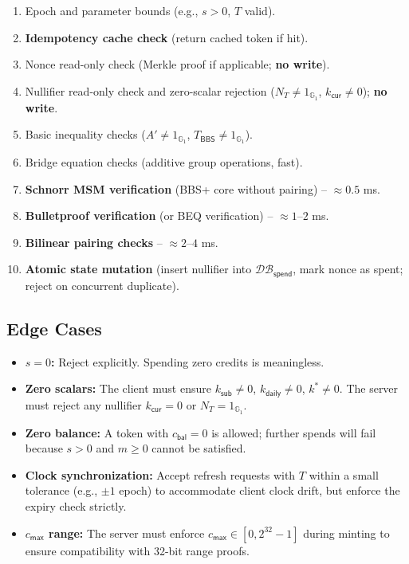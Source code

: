 \documentclass[11pt]{article}
\theoremstyle{definitionstyle}
\theoremstyle{plain}
\newcommand{\DB}{\mathcal{DB}}
\begin{document}
\begin{enumerate}[leftmargin=*]
\item Epoch and parameter bounds (e.g., $s > 0$, $T$ valid).
\item \textbf{Idempotency cache check} (return cached token if hit).
\item Nonce read-only check (Merkle proof if applicable; \textbf{no write}).
\item Nullifier read-only check and zero-scalar rejection ($N_T \neq 1_{\mathbb{G}_1}$, $k_{\mathsf{cur}} \neq 0$); \textbf{no write}.
\item Basic inequality checks ($A' \neq 1_{\mathbb{G}_1}$, $T_{\mathsf{BBS}} \neq 1_{\mathbb{G}_1}$).
\item Bridge equation checks (additive group operations, fast).
\item \textbf{Schnorr MSM verification} (BBS+ core without pairing) – $\approx 0.5$ ms.
\item \textbf{Bulletproof verification} (or BEQ verification) – $\approx 1$--$2$ ms.
\item \textbf{Bilinear pairing checks} – $\approx 2$--$4$ ms.
\item \textbf{Atomic state mutation} (insert nullifier into $\DB_{\mathsf{spend}}$, mark nonce as spent; reject on concurrent duplicate).
\end{enumerate}

\subsection{Edge Cases}

\begin{itemize}[leftmargin=*]
\item \textbf{$s = 0$:} Reject explicitly. Spending zero credits is meaningless.
\item \textbf{Zero scalars:} The client must ensure $k_{\mathsf{sub}} \neq 0$, $k_{\mathsf{daily}} \neq 0$, $k^* \neq 0$. The server must reject any nullifier $k_{\mathsf{cur}} = 0$ or $N_T = 1_{\mathbb{G}_1}$.
\item \textbf{Zero balance:} A token with $c_{\mathsf{bal}} = 0$ is allowed; further spends will fail because $s > 0$ and $m \ge 0$ cannot be satisfied.
\item \textbf{Clock synchronization:} Accept refresh requests with $T$ within a small tolerance (e.g., $\pm 1$ epoch) to accommodate client clock drift, but enforce the expiry check strictly.
\item \textbf{$c_{\mathsf{max}}$ range:} The server must enforce $c_{\mathsf{max}} \in [0, 2^{32}-1]$ during minting to ensure compatibility with 32-bit range proofs.
\end{itemize}
\end{document}
